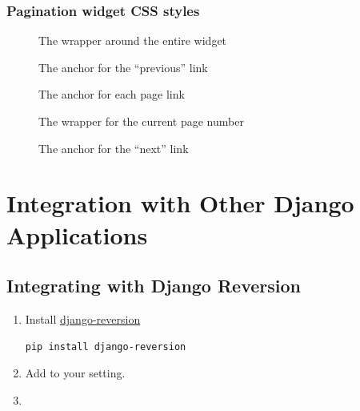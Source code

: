 \documentclass[letterpaper,10pt,english]{manual}
\begin{document}
\subsection{Pagination widget CSS styles}
\begin{description}
\item[] \leavevmode
The wrapper around the entire widget

\item[] \leavevmode
The anchor for the ``previous'' link

\item[] \leavevmode
The anchor for each page link

\item[] \leavevmode
The wrapper for the current page number

\item[] \leavevmode
The anchor for the ``next'' link

\end{description}

\resetcurrentobjects
\hypertarget{--doc-integration/index}{}

\hypertarget{integration-index}{}\chapter{Integration with Other Django Applications}

\resetcurrentobjects
\hypertarget{--doc-integration/reversion\_integration}{}

\hypertarget{reversion-integration}{}\section{Integrating with Django Reversion}
\begin{enumerate}
\item {} 
Install \href{http://code.google.com/p/django-reversion/}{django-reversion}

\begin{Verbatim}[commandchars=@\[\]]
pip install django-reversion
\end{Verbatim}

\item {} 
Add  to your  setting.

\item {} 

\end{enumerate}
\end{document}
